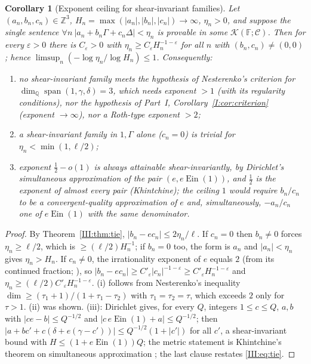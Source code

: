 \documentclass[11pt,a4paper]{article}
\newcommand{\Q}{\mathbb Q}
\newcommand{\Z}{\mathbb Z}
\newcommand{\Ein}{\operatorname{Ein}}
\newcommand{\Fld}{\mathbb F}
\newcommand{\Th}{\mathcal K}
\DeclareMathOperator{\spn}{span}
\newtheorem{corollary}[theorem]{Corollary}
\theoremstyle{definition}
\theoremstyle{remark}
\numberwithin{equation}{section}
\begin{document}
\begin{corollary}[Exponent ceiling for shear-invariant families]\label{III:cor:ceiling}
Let $(a_n,b_n,c_n)\in\Z^3$, $H_n=\max(|a_n|,|b_n|,|c_n|)\to\infty$, $\eta_n>0$, and
suppose the single sentence $\forall n\ |a_n+b_n\Gamma+c_n\Delta|<\eta_n$ is provable
in some $\Th(\Fld;\mathcal C)$. Then for every $\varepsilon>0$ there is $C_\varepsilon>0$
with $\eta_n\ge C_\varepsilon H_n^{-1-\varepsilon}$ for all $n$ with $(b_n,c_n)\ne(0,0)$;
hence $\limsup_n(-\log\eta_n/\log H_n)\le1$. Consequently:
\begin{enumerate}[label=(\roman*)]
\item no shear-invariant family meets the hypothesis of Nesterenko's criterion
\cite{Nesterenko} for $\dim_\Q\spn(1,\gamma,\delta)=3$, which needs exponent $>1$
(with its regularity conditions), nor the hypothesis of Part~I, Corollary~\ref{I:cor:criterion} (exponent
$\to\infty$), nor a Roth-type exponent $>2$;
\item a shear-invariant family in $1,\Gamma$ alone ($c_n=0$) is trivial for
$\eta_n<\min(1,\ell/2)$;
\item exponent $\tfrac12-o(1)$ is always attainable shear-invariantly, by Dirichlet's
simultaneous approximation of the pair $(e,e\Ein(1))$, and $\tfrac12$ is the exponent of
almost every pair (Khintchine); the ceiling $1$ would require $b_n/c_n$ to be a
convergent-quality approximation of $e$ and, simultaneously, $-a_n/c_n$ one of
$e\Ein(1)$ with the same denominator.
\end{enumerate}
\end{corollary}
\begin{proof}
By Theorem~\ref{III:thm:tie}, $|b_n-ec_n|\le2\eta_n/\ell$. If $c_n=0$ then $b_n\ne0$ forces
$\eta_n\ge\ell/2$, which is $\ge(\ell/2)H_n^{-1}$; if $b_n=0$ too, the form is $a_n$ and
$|a_n|<\eta_n$ gives $\eta_n>H_n$. If $c_n\ne0$, the irrationality exponent of $e$
equals $2$ (from its continued fraction; \cite{Davis}), so
$|b_n-ec_n|\ge C'_\varepsilon|c_n|^{-1-\varepsilon}\ge C'_\varepsilon H_n^{-1-\varepsilon}$
and $\eta_n\ge(\ell/2)C'_\varepsilon H_n^{-1-\varepsilon}$. (i) follows from
Nesterenko's inequality $\dim\ge(\tau_1+1)/(1+\tau_1-\tau_2)$ with
$\tau_1=\tau_2=\tau$, which exceeds $2$ only for $\tau>1$. (ii) was shown. (iii):
Dirichlet gives, for every $Q$, integers $1\le c\le Q$, $a,b$ with $|ce-b|\le Q^{-1/2}$
and $|c\,e\Ein(1)+a|\le Q^{-1/2}$; then $|a+bc'+c(\delta+e(\gamma-c'))|\le
Q^{-1/2}(1+|c'|)$ for all $c'$, a shear-invariant bound with $H\le(1+e\Ein(1))Q$; the
metric statement is Khintchine's theorem on simultaneous approximation
\cite{Schmidt}; the last clause restates \eqref{III:eq:tie}.
\end{proof}
\end{document}
